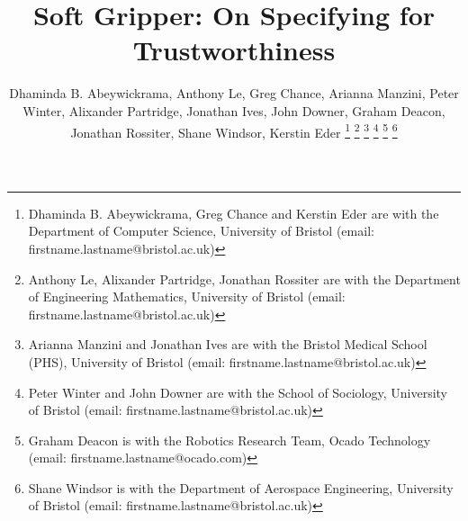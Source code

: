 \documentclass[lettersize,journal]{IEEEtran}
\begin{document}
\linenumbers
\linenumbersep 10pt
\title{Soft Gripper: On Specifying for Trustworthiness}

\author{Dhaminda B. Abeywickrama, Anthony Le, Greg Chance, Arianna Manzini, Peter Winter, Alixander Partridge, Jonathan Ives, John Downer, Graham Deacon, Jonathan Rossiter, Shane Windsor, Kerstin Eder
	\thanks{Dhaminda B. Abeywickrama, Greg Chance and Kerstin Eder are with the Department of Computer Science, University of Bristol (email: firstname.lastname@bristol.ac.uk)}
	\thanks{Anthony Le, Alixander Partridge, Jonathan Rossiter are with the Department of Engineering Mathematics, University of Bristol (email: firstname.lastname@bristol.ac.uk)}
	\thanks{Arianna Manzini and Jonathan Ives are with the Bristol Medical School (PHS), University of Bristol (email: firstname.lastname@bristol.ac.uk)}
	\thanks{Peter Winter and John Downer are with the School of Sociology, University of Bristol (email: firstname.lastname@bristol.ac.uk)}
	\thanks{Graham Deacon is with the Robotics Research Team, Ocado Technology (email: firstname.lastname@ocado.com)}
	\thanks{Shane Windsor is with the Department of Aerospace Engineering, University of Bristol (email: firstname.lastname@bristol.ac.uk)}}
\end{document}
